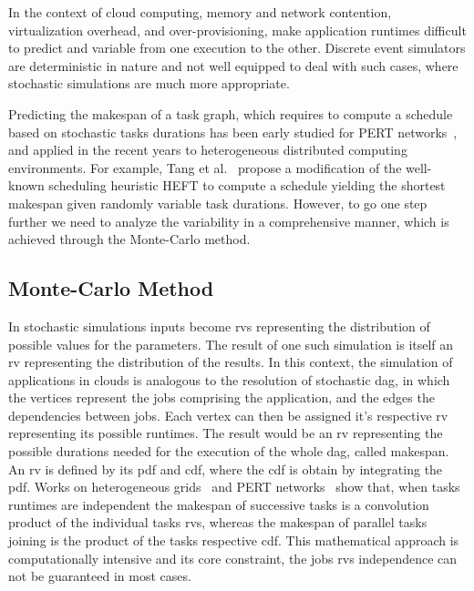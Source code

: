 \documentclass[10pt,conference,compsocconf]{IEEEtran}
\begin{document}
In the context of cloud computing, memory and network contention, virtualization
overhead, and over-provisioning, make  application runtimes difficult to predict
and variable  from one  execution to  the other.  Discrete event  simulators are
deterministic in  nature and not  well equipped to  deal with such  cases, where
stochastic simulations are much more appropriate.

Predicting the  makespan of a task  graph, which requires to  compute a schedule
based  on   stochastic  tasks  durations   has  been  early  studied   for  PERT
networks~\cite{Slyke63},  and  applied  in  the recent  years  to  heterogeneous
distributed  computing environments.   For  example,  Tang et  al.~\cite{Tang11}
propose a modification of the well-known  scheduling heuristic HEFT to compute a
schedule yielding the shortest makespan  given randomly variable task durations.
However,  to go  one  step further  we  need  to analyze  the  variability in  a
comprehensive manner, which is achieved through the Monte-Carlo method.

\subsection{Monte-Carlo Method}

In stochastic simulations inputs become \acfp{rv} representing the distribution
of possible values for the parameters. The result of one such simulation is
itself an \ac{rv} representing the distribution of the results. In this context, the
simulation of applications in clouds is analogous to the resolution of
stochastic \ac{dag}, in which the vertices represent the jobs comprising the
application, and the edges the dependencies between jobs. Each vertex can then
be assigned it's respective \ac{rv} representing its possible runtimes. The
result would be an \ac{rv} representing the possible durations needed for the
execution of the whole \ac{dag}, called makespan. An \ac{rv} is defined by its
\ac{pdf} and \ac{cdf}, where the \ac{cdf} is obtain by integrating the \ac{pdf}.
Works on heterogeneous grids~\cite{Li97} and PERT networks~\cite{Ludwig01} show
that, when tasks runtimes are independent the makespan of successive tasks is a
convolution product of the individual tasks \acp{rv}, whereas the makespan of
parallel tasks joining is the product of the tasks respective \ac{cdf}. This
mathematical approach is computationally intensive and its core constraint, the
jobs \acp{rv} independence can not be guaranteed in most cases. 
\end{document}

